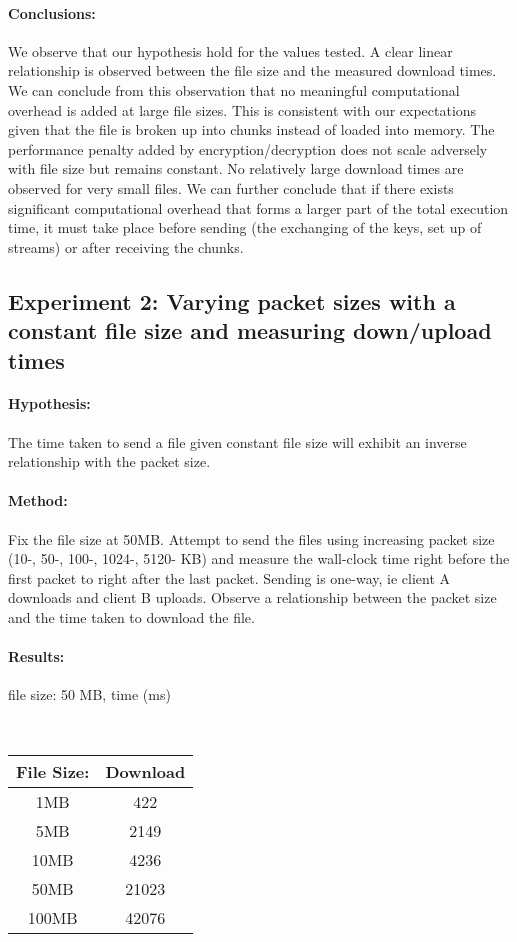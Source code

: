 \documentclass[12pt, a4paper]{article}
\begin{document}
\paragraph{Conclusions:}
We observe that our hypothesis hold for the values tested. A clear linear relationship is observed between the file size and the measured download times. We can conclude from this observation that no meaningful computational overhead is added at large file sizes. This is consistent with our expectations given that the file is broken up into chunks instead of loaded into memory. The performance penalty added by encryption/decryption does not scale adversely with file size but remains constant. No relatively large download times are observed for very small files. We can further conclude that if there exists significant computational overhead that forms a larger part of the total execution time, it must take place before sending (the exchanging of the keys, set up of streams) or after receiving the chunks.

\subsection{Experiment 2: Varying packet sizes with a constant file size and measuring down/upload times}
\paragraph{Hypothesis:}
The time taken to send a file given constant file size will exhibit an inverse relationship with the packet size.
\paragraph{Method:}
 Fix the file size at 50MB. Attempt to send the files using increasing packet size (10-, 50-, 100-, 1024-, 5120- KB) and measure the wall-clock time right before the first packet to right after the last packet. Sending is one-way, ie client A downloads and client B uploads. Observe a relationship between the packet size and the time taken to download the file. 
\paragraph{Results:} 

\begin{center}
\caption{file size: 50 MB, time (ms)}\\
\begin{tabular}{ |c|c| }
   \hline
   File Size: & Download \\
   \hline
   1MB &422\\
   \hline
   5MB&2149 \\
   \hline
   10MB&4236 \\
   \hline
   50MB&21023\\
   \hline
   100MB&42076 \\
   \hline
\end{tabular}
\end{center}
\end{document}
